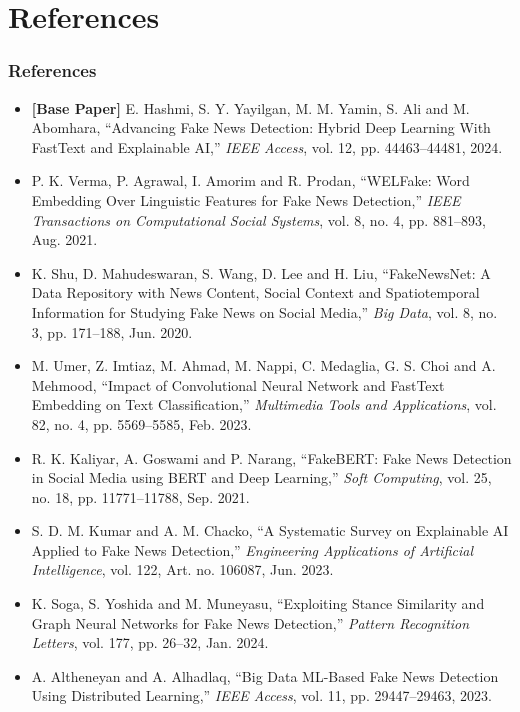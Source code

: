 \documentclass{beamer}
\begin{document}
\section{References}
\begin{frame}[allowframebreaks]
\frametitle{References}
\scriptsize{
\begin{itemize}
    \item \textbf{[Base Paper]} E. Hashmi, S. Y. Yayilgan, M. M. Yamin, S. Ali and M. Abomhara, ``Advancing Fake News Detection: Hybrid Deep Learning With FastText and Explainable AI,'' \textit{IEEE Access}, vol. 12, pp. 44463--44481, 2024.
    \item P. K. Verma, P. Agrawal, I. Amorim and R. Prodan, ``WELFake: Word Embedding Over Linguistic Features for Fake News Detection,'' \textit{IEEE Transactions on Computational Social Systems}, vol. 8, no. 4, pp. 881--893, Aug. 2021.
    \item K. Shu, D. Mahudeswaran, S. Wang, D. Lee and H. Liu, ``FakeNewsNet: A Data Repository with News Content, Social Context and Spatiotemporal Information for Studying Fake News on Social Media,'' \textit{Big Data}, vol. 8, no. 3, pp. 171--188, Jun. 2020.
    \item M. Umer, Z. Imtiaz, M. Ahmad, M. Nappi, C. Medaglia, G. S. Choi and A. Mehmood, ``Impact of Convolutional Neural Network and FastText Embedding on Text Classification,'' \textit{Multimedia Tools and Applications}, vol. 82, no. 4, pp. 5569--5585, Feb. 2023.
    \item R. K. Kaliyar, A. Goswami and P. Narang, ``FakeBERT: Fake News Detection in Social Media using BERT and Deep Learning,'' \textit{Soft Computing}, vol. 25, no. 18, pp. 11771--11788, Sep. 2021.
    \item S. D. M. Kumar and A. M. Chacko, ``A Systematic Survey on Explainable AI Applied to Fake News Detection,'' \textit{Engineering Applications of Artificial Intelligence}, vol. 122, Art. no. 106087, Jun. 2023.
    \item K. Soga, S. Yoshida and M. Muneyasu, ``Exploiting Stance Similarity and Graph Neural Networks for Fake News Detection,'' \textit{Pattern Recognition Letters}, vol. 177, pp. 26--32, Jan. 2024.
    \item A. Altheneyan and A. Alhadlaq, ``Big Data ML-Based Fake News Detection Using Distributed Learning,'' \textit{IEEE Access}, vol. 11, pp. 29447--29463, 2023.

\end{itemize}}
\end{frame}
\end{document}
